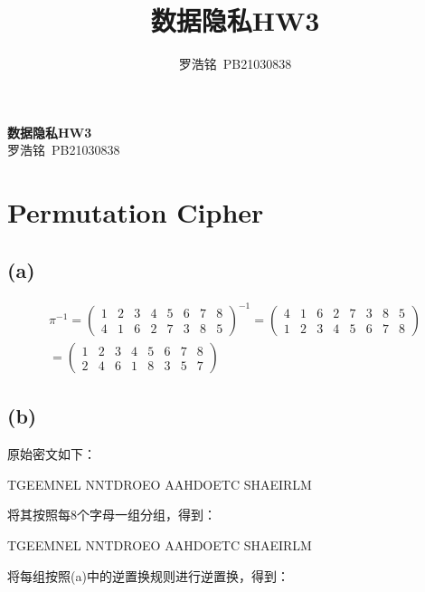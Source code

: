\documentclass[twoside,11pt]{article}
\title{数据隐私HW3}
\author{罗浩铭\ PB21030838}
\begin{document}
\fancyhf{} %
\fancyfoot[C]{\thepage} %

\renewcommand{\headrulewidth}{0pt} %

\begin{center}
    \textbf{\LARGE{数据隐私HW3}}\\
    \vspace{0.1cm}
    \large{罗浩铭\ PB21030838}
\end{center}
\vspace{0.2cm}



\vspace{0.2cm}
\section{Permutation Cipher}
\subsection*{(a)}

\begin{align*}
    \pi^{-1}=
    \begin{pmatrix}
        1 & 2 & 3 & 4 & 5 & 6 & 7 & 8 \\
        4 & 1 & 6 & 2 & 7 & 3 & 8 & 5
    \end{pmatrix}^{-1}
    =
    \begin{pmatrix}
        4 & 1 & 6 & 2 & 7 & 3 & 8 & 5 \\
        1 & 2 & 3 & 4 & 5 & 6 & 7 & 8
    \end{pmatrix} \\
    =
    \begin{pmatrix}
        1 & 2 & 3 & 4 & 5 & 6 & 7 & 8 \\
        2 & 4 & 6 & 1 & 8 & 3 & 5 & 7
    \end{pmatrix}
\end{align*}

\subsection*{(b)}
原始密文如下：

TGEEMNEL NNTDROEO AAHDOETC SHAEIRLM

将其按照每8个字母一组分组，得到：

TGEEMNEL NNTDROEO AAHDOETC SHAEIRLM

将每组按照(a)中的逆置换规则进行逆置换，得到：
\end{document}
